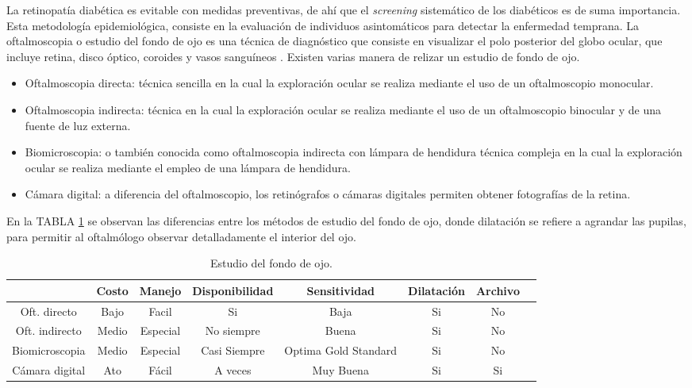 La retinopatía diabética es evitable con medidas preventivas, de ahí que el \textit{screening} sistemático de los diabéticos es de suma importancia. Esta metodología epidemiológica, consiste en la evaluación de individuos asintomáticos para detectar la enfermedad temprana.
La oftalmoscopia o estudio del fondo de ojo es una técnica de diagnóstico que consiste en visualizar el polo posterior del globo ocular, que incluye retina, disco óptico, coroides y vasos sanguíneos \cite{exa}. Existen varias manera de relizar un estudio de fondo de ojo. 
\begin{itemize}
\item Oftalmoscopia directa: técnica sencilla en la cual la exploración ocular se realiza mediante el uso de un oftalmoscopio monocular.
\item Oftalmoscopia indirecta: técnica en la cual la exploración ocular se realiza mediante el uso de un oftalmoscopio binocular y de una fuente de luz externa.
\item Biomicroscopia: o también conocida como oftalmoscopia indirecta con lámpara de hendidura técnica compleja en la cual la exploración ocular se realiza mediante el empleo de una lámpara de hendidura.
\item Cámara digital: a diferencia del oftalmoscopio, los retinógrafos o cámaras digitales  permiten obtener fotografías de la retina.
\end{itemize}

En la TABLA \ref{tab:screening} se observan las diferencias entre los métodos de estudio del fondo de ojo, donde dilatación se refiere a agrandar las pupilas, para permitir al oftalmólogo observar detalladamente el interior del ojo.

\begin{table}[!hbtp]
\begin{center}
\caption{Estudio del fondo de ojo. }
\resizebox{15cm}{!} {
\begin{tabular}{|c|c|c|c| c|c|c| p{2cm}}
\hline
 &Costo& Manejo & Disponibilidad& Sensitividad & Dilatación& Archivo\\ 
\hline
Oft. directo &Bajo&Facil&Si &Baja&Si&No\\
Oft. indirecto &Medio&Especial&No siempre&Buena&Si&No\\
Biomicroscopia & Medio & Especial & Casi Siempre & Optima Gold Standard & Si & No\\

Cámara digital & Ato &Fácil & A veces& Muy Buena & Si &Si   \\

\hline
\end{tabular}
}
\label{tab:screening}
\end{center}

\end{table}







